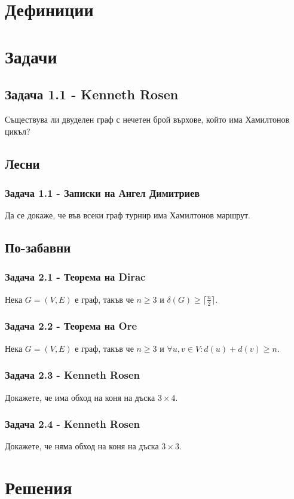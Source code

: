 \documentclass[12pt]{article}
\begin{document}
\section*{Дефиниции}

\section*{Задачи}
\subsection*{Задача 1.1 - Kenneth Rosen}
Съществува ли двуделен граф с нечетен брой върхове, който има Хамилтонов цикъл?

\subsection*{Лесни}
\subsubsection*{Задача 1.1 - Записки на Ангел Димитриев}
Да се докаже, че във всеки граф турнир има Хамилтонов маршрут.

\subsection*{По-забавни}
\subsubsection*{Задача 2.1 - Теорема на Dirac}
Нека $G = (V, E)$ е граф, такъв че $n \geq 3$ и $\delta(G) \geq \lceil \frac{n}{2} \rceil$.
\subsubsection*{Задача 2.2 - Теорема на Ore}
Нека $G = (V, E)$ е граф, такъв че $n \geq 3$ и $\forall u, v \in V: d(u) + d(v) \geq n$.
\subsubsection*{Задача 2.3 - Kenneth Rosen}
Докажете, че има обход на коня на дъска $3 \times 4$.
\subsubsection*{Задача 2.4 - Kenneth Rosen}
Докажете, че няма обход на коня на дъска $3 \times 3$.

\section*{Решения}
\end{document}

